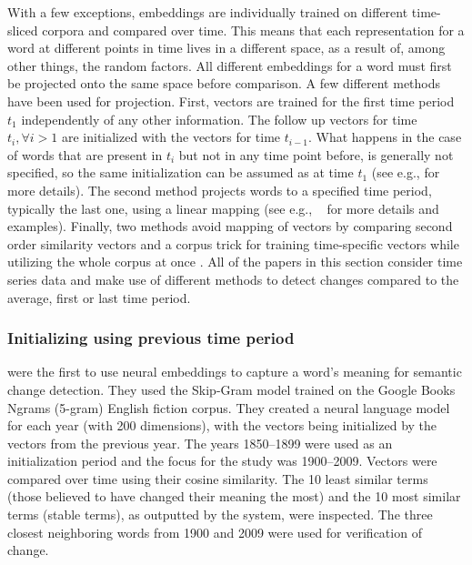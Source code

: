 \documentclass[output=paper]{langsci/langscibook}
\begin{document}
      With a few exceptions, embeddings are individually trained  on different time-sliced corpora and compared over time. This means that each representation for a word at different points in time lives in a different space,  as a result of, among other things, the random factors. All different embeddings for a word must first be projected onto the same space before comparison. A few different methods have been used for projection. 
      First, vectors are trained for the first time period $t_1$ independently of any other information. The follow up vectors for time $t_i ,  \forall i > 1$ are initialized with the vectors for time $t_{i-1}$. What happens in the case of words that are present in $t_i$ but not in any time point before, is generally not specified, so the same initialization can be assumed as at time $t_1$ (see e.g.,  \citealp{kim-etal-2014-temporal} for more details).
      The second method projects words to a specified time period, typically the last one, using a linear mapping (see  e.g., ~\citealp{kulkarni2015statistically, hamilton-etal-2016-diachronic} for more details and examples). 
      Finally, two methods avoid mapping of vectors by comparing second order similarity vectors \citep[see][]{eger-mehler-2016-linearity} and a corpus trick for training time-specific vectors while utilizing the whole corpus at once \citep{dubossarsky-etal-2019-time}.  All of the papers in this section consider time series data and make use of different methods to detect changes compared to the average, first or last time period. 
      

  
\subsubsection{Initializing using previous time period}
 \citet{kim-etal-2014-temporal} were the first to use neural embeddings to capture a word's meaning for semantic change detection.  They used the Skip-Gram model \citep{mikolov2013efficient} trained on the Google Books Ngrams (5-gram) English fiction corpus. They created a neural language model for each year (with 200 dimensions), with the vectors being initialized by the vectors from the previous year. The years 1850--1899 were used as an initialization period and the focus for the study was 1900--2009. Vectors were compared over time using their cosine similarity. The 10 least similar terms (those believed to have changed their meaning the most) and the 10 most similar terms (stable terms), as outputted by the system, were inspected. 
The three closest neighboring words from 1900 and 2009 were used for verification of change.
\end{document}
